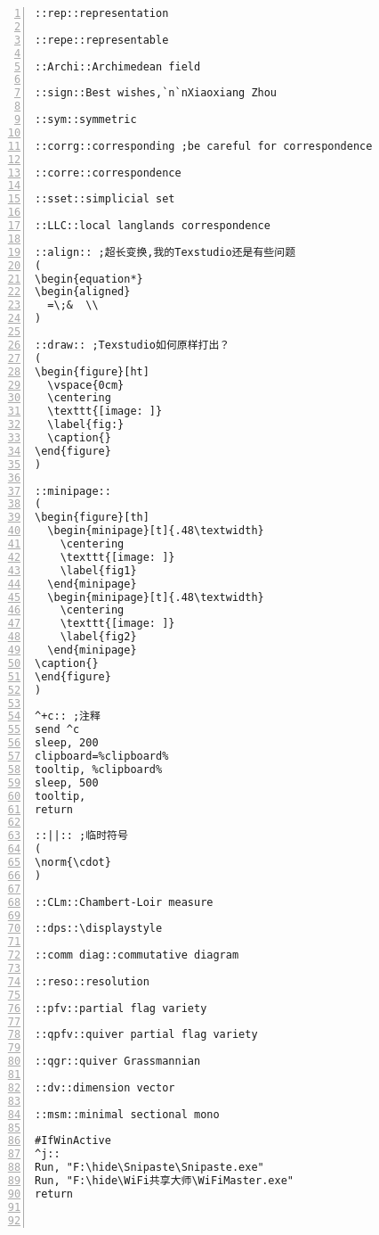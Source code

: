 \documentclass[11pt]{amsart}
\begin{document}
\begin{lstlisting}[numbers=left,numberstyle=\tiny,numbersep=10pt]
::rep::representation

::repe::representable 

::Archi::Archimedean field

::sign::Best wishes,`n`nXiaoxiang Zhou

::sym::symmetric

::corrg::corresponding ;be careful for correspondence

::corre::correspondence

::sset::simplicial set

::LLC::local langlands correspondence

::align:: ;超长变换,我的Texstudio还是有些问题
(
\begin{equation*}
\begin{aligned}
  =\;&  \\
)

::draw:: ;Texstudio如何原样打出？
(
\begin{figure}[ht]
  \vspace{0cm}
  \centering
  \texttt{[image: ]}
  \label{fig:}
  \caption{}
\end{figure}
)

::minipage::
(
\begin{figure}[th]
  \begin{minipage}[t]{.48\textwidth}
    \centering
    \texttt{[image: ]}
    \label{fig1}
  \end{minipage}
  \begin{minipage}[t]{.48\textwidth}
    \centering
    \texttt{[image: ]}
    \label{fig2}
  \end{minipage}
\caption{}
\end{figure}
)

^+c:: ;注释
send ^c
sleep, 200
clipboard=%clipboard%
tooltip, %clipboard%
sleep, 500
tooltip,
return

::||:: ;临时符号
(
\norm{\cdot} 
)

::CLm::Chambert-Loir measure

::dps::\displaystyle

::comm diag::commutative diagram

::reso::resolution

::pfv::partial flag variety

::qpfv::quiver partial flag variety

::qgr::quiver Grassmannian

::dv::dimension vector

::msm::minimal sectional mono

#IfWinActive
^j::  
Run, "F:\hide\Snipaste\Snipaste.exe"
Run, "F:\hide\WiFi共享大师\WiFiMaster.exe"
return



\end{lstlisting}
\end{document}
